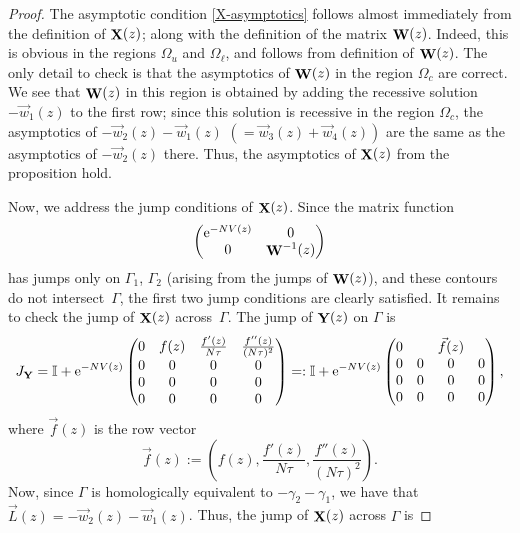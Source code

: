 \documentclass[pdftex]{sigma}
\DeclareMathOperator{\YY}{{\bf Y}}
\DeclareMathOperator{\XX}{{\bf X}}
\DeclareMathOperator{\WW}{{\bf W}}
\numberwithin{equation}{section}
\begin{document}
\begin{proof}
 The asymptotic condition \eqref{X-asymptotics} follows almost immediately from the definition of $\XX(z)$; along with the definition of the matrix $\WW(z)$. Indeed, this is obvious in the regions $\Omega_u$ and $\Omega_\ell$, and follows from definition of $\WW(z)$. The only detail to check
 is that the asymptotics of $\WW(z)$ in the region $\Omega_c$ are correct. We see that $\WW(z)$ in this region is obtained by adding the recessive solution $-\vec{w}_1(z)$
 to the first row; since this solution is recessive in the region $\Omega_c$, the asymptotics of $-\vec{w}_2(z) - \vec{w}_1(z)$ $(= \vec{w}_3(z)+ \vec{w}_4(z))$ are the same as the
 asymptotics of $-\vec{w}_2(z)$ there. Thus, the asymptotics of $\XX(z)$ from the
 proposition hold.

 Now, we address the jump conditions of $\XX(z)$. Since the matrix function
 \begin{equation*}
 \begin{pmatrix}
 {\rm e}^{-NV(z)} & 0 \\
 0 & \WW^{-1}(z)
 \end{pmatrix}
 \end{equation*}
 has jumps only on $\Gamma_1$, $\Gamma_2$ (arising from the jumps of $\WW(z)$), and these contours do not intersect~$\Gamma$, the first two jump conditions are clearly satisfied. It remains to check the jump of $\XX(z)$ across~$\Gamma$. The jump of $\YY(z)$ on $\Gamma$ is
 \begin{equation*}
 J_{\YY} = \mathbb{I} +
 {\rm e}^{-NV(z)}\begin{pmatrix}
 0 & f(z) & \frac{f'(z)}{N\tau} & \frac{f''(z)}{(N\tau)^2} \\
 0 & 0 & 0 & 0 \\
 0 & 0 & 0 & 0 \\
 0 & 0 & 0 & 0
 \end{pmatrix}
 =:
 \mathbb{I} + {\rm e}^{-NV(z)} \begin{pmatrix}
 0 & & \vec{f}(z) & \\
 0 & 0 & 0 & 0 \\
 0 & 0 & 0 & 0 \\
 0 & 0 & 0 & 0
 \end{pmatrix},
 \end{equation*}
 where $\vec{f}(z)$ is the row vector
 \begin{equation*}
 \vec{f}(z) := \left(
 f(z), \frac{f'(z)}{N\tau}, \frac{f''(z)}{(N\tau)^2} \right).
 \end{equation*}
 Now, since $\Gamma$ is homologically equivalent to $-\gamma_2 - \gamma_1$, we have that $\vec{L}(z) = -\vec{w}_2(z) - \vec{w}_1(z)$. Thus, the jump of $\XX(z)$ across $\Gamma$ is

\end{proof}
\end{document}
